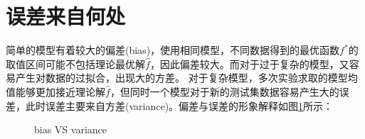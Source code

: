 \section{误差来自何处}

简单的模型有着较大的偏差(bias)，使用相同模型，不同数据得到的最优函数$f^*$的取值区间可能不包括理论最优解$\hat{f}$，因此偏差较大。而对于过于复杂的模型，又容易产生对数据的过拟合，出现大的方差。
对于复杂模型，多次实验求取的模型均值能够更加接近理论解$\hat{f}$，但同时一个模型对于新的测试集数据容易产生大的误差，此时误差主要来自方差(variance)。偏差与误差的形象解释如图\ref{fig:bias_and_variance}所示：
\begin{figure}
	\centering

	{\qquad
	}
	\caption{bias VS variance}
	\label{fig:bias_and_variance}
\end{figure}

